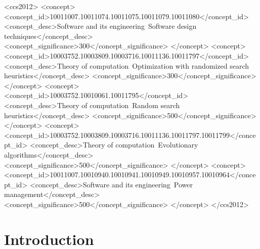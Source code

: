 \documentclass[sigconf]{acmart}
\begin{document}
%
%
\begin{CCSXML}
<ccs2012>
   <concept>
       <concept_id>10011007.10011074.10011075.10011079.10011080</concept_id>
       <concept_desc>Software and its engineering~Software design techniques</concept_desc>
       <concept_significance>300</concept_significance>
       </concept>
   <concept>
       <concept_id>10003752.10003809.10003716.10011136.10011797</concept_id>
       <concept_desc>Theory of computation~Optimization with randomized search heuristics</concept_desc>
       <concept_significance>300</concept_significance>
       </concept>
   <concept>
       <concept_id>10003752.10010061.10011795</concept_id>
       <concept_desc>Theory of computation~Random search heuristics</concept_desc>
       <concept_significance>500</concept_significance>
       </concept>
   <concept>
       <concept_id>10003752.10003809.10003716.10011136.10011797.10011799</concept_id>
       <concept_desc>Theory of computation~Evolutionary algorithms</concept_desc>
       <concept_significance>500</concept_significance>
       </concept>
   <concept>
       <concept_id>10011007.10010940.10010941.10010949.10010957.10010964</concept_id>
       <concept_desc>Software and its engineering~Power management</concept_desc>
       <concept_significance>500</concept_significance>
       </concept>
 </ccs2012>
\end{CCSXML}



\maketitle

\section{Introduction}
\label{sec:introduction}
\end{document}
